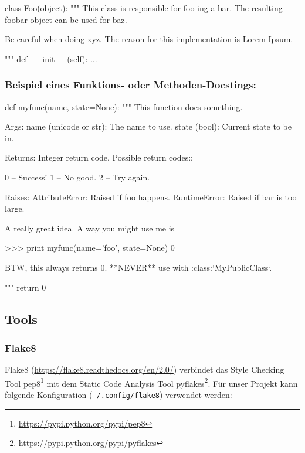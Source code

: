 \begin{pythoncode}
class Foo(object):
    """
    This class is responsible for foo-ing a bar. The resulting foobar object
    can be used for baz.

    Be careful when doing xyz. The reason for this implementation is Lorem
    Ipsum.

    """
    def __init__(self):
        ...
\end{pythoncode}

\subsubsection*{Beispiel eines Funktions- oder Methoden-Docstings:}

\begin{pythoncode}
def myfunc(name, state=None):
    """
    This function does something.

    Args:
        name (unicode or str):
            The name to use.
        state (bool):
            Current state to be in.

    Returns:
        Integer return code. Possible return codes::

            0 -- Success!
            1 -- No good.
            2 -- Try again.

    Raises:
        AttributeError:
            Raised if foo happens.
        RuntimeError:
            Raised if bar is too large.

    A really great idea. A way you might use me is

    >>> print myfunc(name='foo', state=None)
    0

    BTW, this always returns 0. **NEVER** use with :class:`MyPublicClass`.

    """
    return 0
\end{pythoncode}

\subsection{Tools}

\subsubsection{Flake8}

Flake8 (\url{https://flake8.readthedocs.org/en/2.0/}) verbindet das Style
Checking Tool pep8\footnote{\url{https://pypi.python.org/pypi/pep8}} mit dem
Static Code Analysis Tool
pyflakes\footnote{\url{https://pypi.python.org/pypi/pyflakes}}. Für unser
Projekt kann folgende Konfiguration (\texttt{~/.config/flake8}) verwendet
werden:

